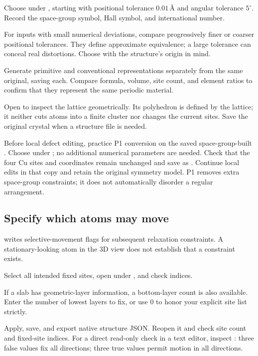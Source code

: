 \begin{steps}
  \item Choose  under , starting with positional tolerance $0.01\,\text{\AA}$ and angular tolerance $5^\circ$. Record the space-group symbol, Hall symbol, and international number.
  \item For inputs with small numerical deviations, compare progressively finer or coarser positional tolerances. They define approximate equivalence; a large tolerance can conceal real distortions. Choose with the structure's origin in mind.
  \item Generate primitive and conventional representations separately from the same original, saving each. Compare formula, volume, site count, and element ratios to confirm that they represent the same periodic material.
  \item Open  to inspect the lattice geometrically. Its polyhedron is defined by the lattice; it neither cuts atoms into a finite cluster nor changes the current sites. Save the original crystal when a structure file is needed.
\end{steps}

Before local defect editing, practice P1 conversion on the saved space-group-built . Choose  under ; no additional numerical parameters are needed. Check that the four Cu sites and coordinates remain unchanged and save as . Continue local edits in that copy and retain the original symmetry model. P1 removes extra space-group constraints; it does not automatically disorder a regular arrangement.

\subsection{Specify which atoms may move}\label{sec:fixed-sites-reference}

 writes selective-movement flags for subsequent relaxation constraints. A stationary-looking atom in the 3D view does not establish that a constraint exists.

\begin{steps}
  \item Select all intended fixed sites, open  under , and check indices.
  \item If a slab has geometric-layer information, a bottom-layer count is also available. Enter the number of lowest layers to fix, or use 0 to honor your explicit site list strictly.
  \item Apply, save, and export native structure JSON. Reopen it and check site count and fixed-site indices. For a direct read-only check in a text editor, inspect : three false values fix all directions; three true values permit motion in all directions.
\end{steps}

